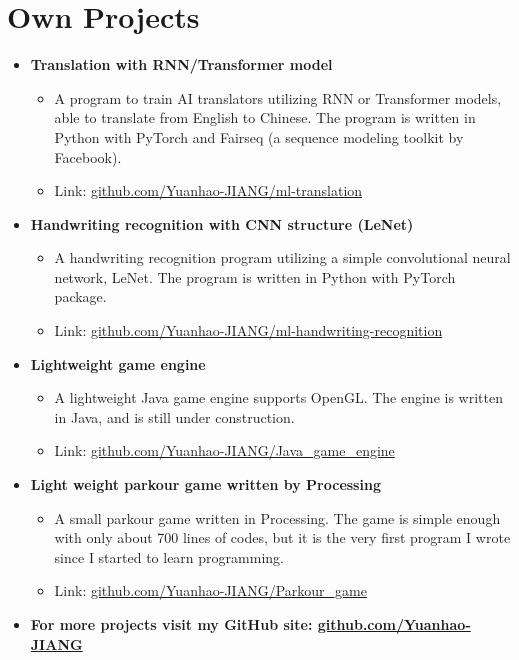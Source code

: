 \documentclass[12pt, a4paper]{article}
\newcommand{\resumeSection}[1]{
    \section*{#1}
}
\newcommand{\resumeSectionSubItmII}[1]{\item \textbf{#1}}
\begin{document}
\resumeSection{Own Projects}
\vspace{1mm}
\begin{itemize}[leftmargin=*]
    \resumeSectionSubItmII{Translation with RNN/Transformer model}
    \vspace{-2.5mm}
    \begin{itemize}[leftmargin=*]
        \item A program to train AI translators utilizing RNN or Transformer
            models, able to translate from English to Chinese. The program is
            written in Python with PyTorch and Fairseq (a sequence modeling
            toolkit by Facebook).
        \item Link: \href{https://github.com/Yuanhao-JIANG/ml-translation}
            {github.com/Yuanhao-JIANG/ml-translation}
    \end{itemize}
    \resumeSectionSubItmII{Handwriting recognition with CNN structure (LeNet)}
    \vspace{-2.5mm}
    \begin{itemize}[leftmargin=*]
        \item A handwriting recognition program utilizing a simple convolutional
            neural network, LeNet. The program is written in Python with
            PyTorch package.
        \item Link: \href{https://github.com/Yuanhao-JIANG/ml-handwriting-recognition}
            {github.com/Yuanhao-JIANG/ml-handwriting-recognition}
    \end{itemize}
    \resumeSectionSubItmII{Lightweight game engine}
    \vspace{-2.5mm}
    \begin{itemize}[leftmargin=*]
        \item A lightweight Java game engine supports OpenGL. The engine is
            written in Java, and is still under construction.
        \item Link: \href{https://github.com/Yuanhao-JIANG/Java\_game\_engine}
            {github.com/Yuanhao-JIANG/Java\_game\_engine}
    \end{itemize}
    \resumeSectionSubItmII{Light weight parkour game written by Processing}
    \vspace{-2.5mm}
    \begin{itemize}[leftmargin=*]
        \item A small parkour game written in Processing. The game is simple
            enough with only about 700 lines of codes, but it is the very first
            program I wrote since I started to learn programming.
        \item Link: \href{https://github.com/Yuanhao-JIANG/Parkour_game}
            {github.com/Yuanhao-JIANG/Parkour\_game}
    \end{itemize}
    \resumeSectionSubItmII{For more projects visit my GitHub site:
    \href{https://github.com/Yuanhao-JIANG}{github.com/Yuanhao-JIANG}}
\end{itemize}
\end{document}
